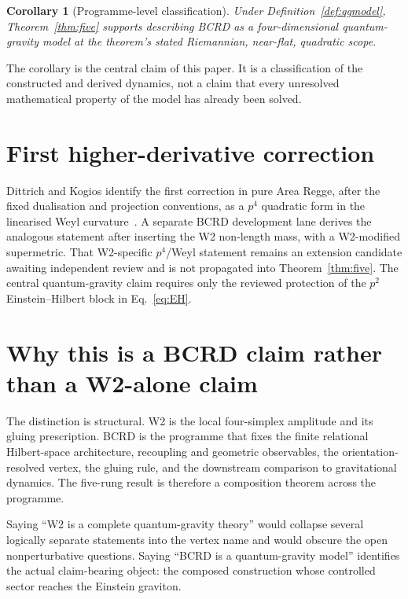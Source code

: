 \documentclass[11pt]{article}
\numberwithin{equation}{section}
\newtheorem{corollary}[theorem]{Corollary}
\begin{document}
\begin{corollary}[Programme-level classification]
Under Definition~\ref{def:qgmodel}, Theorem~\ref{thm:five} supports describing BCRD as a four-dimensional quantum-gravity model at the theorem's stated Riemannian, near-flat, quadratic scope.
\end{corollary}

The corollary is the central claim of this paper. It is a classification of the constructed and derived dynamics, not a claim that every unresolved mathematical property of the model has already been solved.

\section{First higher-derivative correction}

Dittrich and Kogios identify the first correction in pure Area Regge, after the fixed dualisation and projection conventions, as a $p^4$ quadratic form in the linearised Weyl curvature~\cite{DittrichKogios2023}. A separate BCRD development lane derives the analogous statement after inserting the W2 non-length mass, with a W2-modified supermetric. That W2-specific $p^4$/Weyl statement remains an extension candidate awaiting independent review and is not propagated into Theorem~\ref{thm:five}. The central quantum-gravity claim requires only the reviewed protection of the $p^2$ Einstein--Hilbert block in Eq.~\eqref{eq:EH}.

\section{Why this is a BCRD claim rather than a W2-alone claim}

The distinction is structural. W2 is the local four-simplex amplitude and its gluing prescription. BCRD is the programme that fixes the finite relational Hilbert-space architecture, recoupling and geometric observables, the orientation-resolved vertex, the gluing rule, and the downstream comparison to gravitational dynamics. The five-rung result is therefore a composition theorem across the programme.

Saying ``W2 is a complete quantum-gravity theory'' would collapse several logically separate statements into the vertex name and would obscure the open nonperturbative questions. Saying ``BCRD is a quantum-gravity model'' identifies the actual claim-bearing object: the composed construction whose controlled sector reaches the Einstein graviton.
\end{document}
